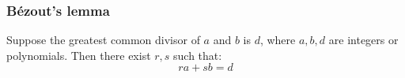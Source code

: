 \begin{frame}
\frametitle{B\'ezout's lemma}
\begin{lemma}[B\'ezout]
Suppose the greatest common divisor of $a$ and $b$ is $d$, where $a,b,d$ are integers or polynomials. Then there exist $r,s$ such that:
\[
ra+sb=d
\]
\end{lemma}
\end{frame}


